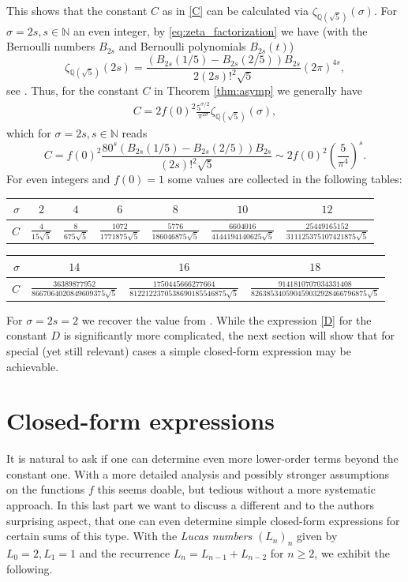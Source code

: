 \documentclass[]{interact}
\newcommand{\bbN}{\mathbb{N}}
\newcommand{\bbQ}{\mathbb{Q}}
\theoremstyle{definition}
\numberwithin{table}{section} %
\numberwithin{figure}{section}
\begin{document}
This shows that the constant $C$ as in \eqref{C} can be calculated via $\zeta_{\bbQ(\sqrt5)}(\sigma)$. For $\sigma = 2s, s \in \bbN$ an even integer, by \eqref{eq:zeta_factorization} we have (with the Bernoulli numbers $B_{2s}$ and Bernoulli polynomials $B_{2s}(t)$)
$$
\zeta_{\bbQ(\sqrt5)}(2s) = \frac{(B_{2s}(1/5) - B_{2s}(2/5)) B_{2s}}{2 (2s)!^2 \sqrt5} (2\pi)^{4s},
$$
see \cite{Neu99, Was97}. Thus, for the constant $C$ in Theorem \ref{thm:asymp} we generally have
\begin{align} \label{eq:C_exact}
    C = 2 f(0)^2 \frac{5^{\sigma / 2}}{\pi^{2\sigma}} \zeta_{\bbQ(\sqrt5)}(\sigma),
\end{align}
which for $\sigma = 2s, s \in \bbN$ reads
$$
C = f(0)^2 \frac{80^s (B_{2s}(1/5) - B_{2s}(2/5)) B_{2s}}{(2s)!^2 \sqrt5} \sim 2f(0)^2 \left(\frac5{\pi^4}\right)^s.
$$
For even integers and $f(0) = 1$ some values are collected in the following tables:
\begin{center}
	\begin{tabular}{r||c|c|c|c|c|c}
		$\sigma$ & $2$ & $4$ & $6$ & $8$ & $10$ & $12$ \\
		\hline
		$C$ & $\frac{4}{15\sqrt5}$ & $\frac{8}{675\sqrt5}$ & $\frac{1072}{1771875\sqrt5}$ & $\frac{5776}{186046875\sqrt5}$ & $\frac{6604016}{4144194140625\sqrt5}$ & $\frac{25449165152}{311125375107421875\sqrt5}$
	\end{tabular}
\end{center}
\begin{center}
	\begin{tabular}{r||c|c|c}
		$\sigma$ & $14$ & $16$ & $18$ \\
		\hline
		$C$ & $\frac{36389877952}{8667064020849609375\sqrt5}$ & $\frac{1750445666277664}{8122122370538690185546875\sqrt5}$ & $\frac{9141810707034331408}{826385340590459032928466796875\sqrt5}$
	\end{tabular}
\end{center}
For $\sigma = 2s = 2$ we recover the value from \cite{Bor17, HKP21}. While the expression \eqref{D} for the constant $D$ is significantly more complicated, the next section will show that for special (yet still relevant) cases a simple closed-form expression may be achievable.

\section{Closed-form expressions}

It is natural to ask if one can determine even more lower-order terms beyond the constant one. With a more detailed analysis and possibly stronger assumptions on the functions $f$ this seems doable, but tedious without a more systematic approach. In this last part we want to discuss a different and to the authors surprising aspect, that one can even determine simple closed-form expressions for certain sums of this type. With the \emph{Lucas numbers} $(L_n)_n$ given by $L_0=2, L_1=1$ and the recurrence $L_n=L_{n-1}+L_{n-2}$ for $n \geq 2$, we exhibit the following.
\end{document}
